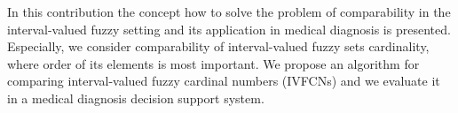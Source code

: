 
In this contribution the concept how to solve the problem of comparability in the interval-valued fuzzy setting and its application in medical diagnosis is presented. Especially, we consider comparability of interval-valued fuzzy sets cardinality, where order of its elements is most important.  We propose an algorithm for comparing interval-valued fuzzy cardinal numbers (IVFCNs) and we evaluate it in a medical diagnosis decision support system.



